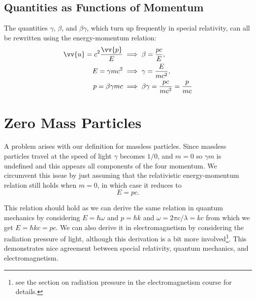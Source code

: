 \documentclass[fleqn]{NotesClass}
\begin{document}
    \subsection{Quantities as Functions of Momentum}
    The quantities \(\gamma\), \(\beta\), and \(\beta\gamma\), which turn up frequently in special relativity, can all be rewritten using the energy-momentum relation:
    \begin{align}
        \vv{u} = c^2\frac{\vv{p}}{E} &\implies \beta = \frac{pc}{E},\\
        E = \gamma mc^2 &\implies \gamma = \frac{E}{mc^2},\\
        p = \beta \gamma mc &\implies \beta\gamma = \frac{pc}{mc^2} = \frac{p}{mc}
    \end{align}
    
    \section{Zero Mass Particles}
    A problem arises with our definition for massless particles.
    Since massless particles travel at the speed of light \(\gamma\) becomes \(1/0\), and \(m = 0\) so \(\gamma m\) is undefined and this appears all components of the four momentum.
    We circumvent this issue by just assuming that the relativistic energy-momentum relation still holds when \(m = 0\), in which case it reduces to
    \begin{equation}
        E = pc.
    \end{equation}
    
    This relation should hold as we can derive the same relation in quantum mechanics by considering \(E = \hbar\omega\) and \(p = \hbar k\) and \(\omega = 2\pi c/\lambda = kc\) from which we get \(E = \hbar kc = pc\).
    We can also derive it in electromagnetism by considering the radiation pressure of light, although this derivation is a bit more involved\footnote{see the section on radiation pressure in the electromagnetism course for details.}.
    This demonstrates nice agreement between special relativity, quantum mechanics, and electromagnetism.
    
\end{document}
